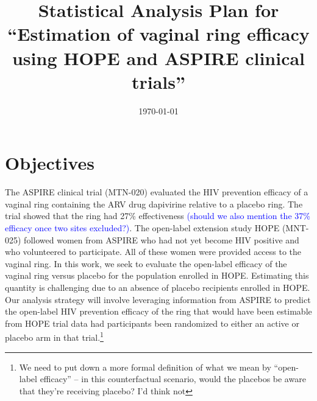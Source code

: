 \documentclass[12pt]{article}
\title{Statistical Analysis Plan for ``Estimation of vaginal ring efficacy using HOPE and ASPIRE clinical trials''}
\author{}
\date{\today}
\theoremstyle{definition}
\begin{document}



\def\spacingset#1{\renewcommand{\baselinestretch}%
{#1}\small\normalsize} \spacingset{1}



\maketitle







\section{Objectives}

    The ASPIRE clinical trial (MTN-020) evaluated the HIV prevention efficacy of a vaginal ring containing the ARV drug dapivirine relative to a placebo ring. The trial showed that the ring had 27\% effectiveness \textcolor{blue}{(should we also mention the 37\% efficacy once two sites excluded?)}. The open-label extension study HOPE (MNT-025) followed women from ASPIRE who had not yet become HIV positive and who volunteered to participate. All of these women were provided access to the vaginal ring. In this work, we seek to evaluate the open-label efficacy of the vaginal ring versus placebo for the population enrolled in HOPE. Estimating this quantity is challenging due to an absence of placebo recipients enrolled in HOPE. Our analysis strategy will involve leveraging information from ASPIRE to predict the open-label HIV prevention efficacy of the ring that would have been estimable from HOPE trial data had participants been randomized to either an active or placebo arm in that trial.\footnote{\color{blue}We need to put down a more formal definition of what we mean by ``open-label efficacy'' -- in this counterfactual scenario, would the placebos be aware that they're receiving placebo? I'd think not}
\end{document}
